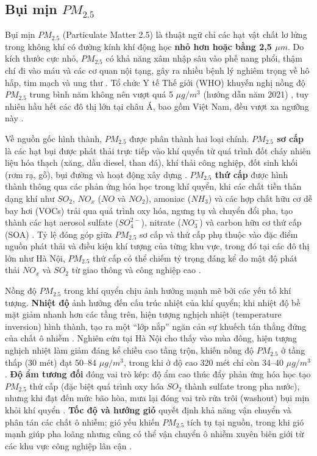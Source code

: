 \subsection{Bụi mịn $PM_{2.5}$}

Bụi mịn $PM_{2.5}$ (Particulate Matter 2.5) là thuật ngữ chỉ các hạt vật chất lơ lửng trong không khí có đường kính khí động học \textbf{nhỏ hơn hoặc bằng 2,5 $\mu m$}. Do kích thước cực nhỏ, $PM_{2.5}$ có khả năng xâm nhập sâu vào phế nang phổi, thậm chí đi vào máu và các cơ quan nội tạng, gây ra nhiều bệnh lý nghiêm trọng về hô hấp, tim mạch và ung thư \cite{le2024environmental}. Tổ chức Y tế Thế giới (WHO) khuyến nghị nồng độ $PM_{2.5}$ trung bình năm không nên vượt quá 5 $\mu g/m^3$ (hướng dẫn năm 2021) \cite{WHO_2021_AQG}, tuy nhiên hầu hết các đô thị lớn tại châu Á, bao gồm Việt Nam, đều vượt xa ngưỡng này \cite{krzyzanowski2014megacities}.

Về nguồn gốc hình thành, $PM_{2.5}$ được phân thành hai loại chính. \textbf{$PM_{2.5}$ sơ cấp} là các hạt bụi được phát thải trực tiếp vào khí quyển từ quá trình đốt cháy nhiên liệu hóa thạch (xăng, dầu diesel, than đá), khí thải công nghiệp, đốt sinh khối (rơm rạ, gỗ), bụi đường và hoạt động xây dựng \cite{ho2025assessment, bui2025urbanization}. \textbf{$PM_{2.5}$ thứ cấp} được hình thành thông qua các phản ứng hóa học trong khí quyển, khi các chất tiền thân dạng khí như $SO_2$, $NO_x$ ($NO$ và $NO_2$), amoniac ($NH_3$) và các hợp chất hữu cơ dễ bay hơi (VOCs) trải qua quá trình oxy hóa, ngưng tụ và chuyển đổi pha, tạo thành các hạt aerosol sulfate ($SO_4^{2-}$), nitrate ($NO_3^{-}$) và carbon hữu cơ thứ cấp (SOA) \cite{le2024environmental}. Tỷ lệ đóng góp giữa $PM_{2.5}$ sơ cấp và thứ cấp phụ thuộc vào đặc điểm nguồn phát thải và điều kiện khí tượng của từng khu vực, trong đó tại các đô thị lớn như Hà Nội, $PM_{2.5}$ thứ cấp có thể chiếm tỷ trọng đáng kể do mật độ phát thải $NO_x$ và $SO_2$ từ giao thông và công nghiệp cao \cite{ho2025assessment}.

Nồng độ $PM_{2.5}$ trong khí quyển chịu ảnh hưởng mạnh mẽ bởi các yếu tố khí tượng. \textbf{Nhiệt độ} ảnh hưởng đến cấu trúc nhiệt của khí quyển; khi nhiệt độ bề mặt giảm nhanh hơn các tầng trên, hiện tượng nghịch nhiệt (temperature inversion) hình thành, tạo ra một ``lớp nắp'' ngăn cản sự khuếch tán thẳng đứng của chất ô nhiễm \cite{dam2024pm25}. Nghiên cứu tại Hà Nội cho thấy vào mùa đông, hiện tượng nghịch nhiệt làm giảm đáng kể chiều cao tầng trộn, khiến nồng độ $PM_{2.5}$ ở tầng thấp (30 mét) đạt 50--84 $\mu g/m^3$, trong khi ở độ cao 320 mét chỉ còn 34--40 $\mu g/m^3$ \cite{dam2024pm25, nguyen2024cmaq}. \textbf{Độ ẩm tương đối} đóng vai trò kép: độ ẩm cao thúc đẩy phản ứng hóa học tạo $PM_{2.5}$ thứ cấp (đặc biệt quá trình oxy hóa $SO_2$ thành sulfate trong pha nước), nhưng khi đạt đến mức bão hòa, mưa lại đóng vai trò rửa trôi (washout) bụi mịn khỏi khí quyển \cite{dam2024pm25}. \textbf{Tốc độ và hướng gió} quyết định khả năng vận chuyển và phân tán các chất ô nhiễm; gió yếu khiến $PM_{2.5}$ tích tụ tại nguồn, trong khi gió mạnh giúp pha loãng nhưng cũng có thể vận chuyển ô nhiễm xuyên biên giới từ các khu vực công nghiệp lân cận \cite{ho2025assessment}.

